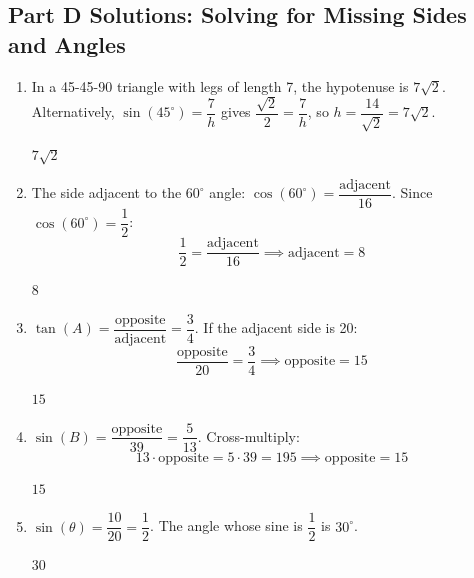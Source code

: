 \documentclass[14pt]{extarticle}
\begin{document}
\subsection*{Part D Solutions: Solving for Missing Sides and Angles}
\begin{enumerate}
  \item In a 45-45-90 triangle with legs of length 7, the hypotenuse is \(7\sqrt{2}\). Alternatively, \(\sin(45^\circ) = \dfrac{7}{h}\) gives \(\dfrac{\sqrt{2}}{2} = \dfrac{7}{h}\), so \(h = \dfrac{14}{\sqrt{2}} = 7\sqrt{2}\).

  \(\boxed{7\sqrt{2}}\)

  \item The side adjacent to the \(60^\circ\) angle: \(\cos(60^\circ) = \dfrac{\text{adjacent}}{16}\). Since \(\cos(60^\circ) = \dfrac{1}{2}\):
  \[
  \frac{1}{2} = \frac{\text{adjacent}}{16} \implies \text{adjacent} = 8
  \]

  \(\boxed{8}\)

  \item \(\tan(A) = \dfrac{\text{opposite}}{\text{adjacent}} = \dfrac{3}{4}\). If the adjacent side is 20:
  \[
  \frac{\text{opposite}}{20} = \frac{3}{4} \implies \text{opposite} = 15
  \]

  \(\boxed{15}\)

  \item \(\sin(B) = \dfrac{\text{opposite}}{39} = \dfrac{5}{13}\). Cross-multiply:
  \[
  13 \cdot \text{opposite} = 5 \cdot 39 = 195 \implies \text{opposite} = 15
  \]

  \(\boxed{15}\)

  \item \(\sin(\theta) = \dfrac{10}{20} = \dfrac{1}{2}\). The angle whose sine is \(\dfrac{1}{2}\) is \(30^\circ\).

  \(\boxed{30}\)
\end{enumerate}
\end{document}
